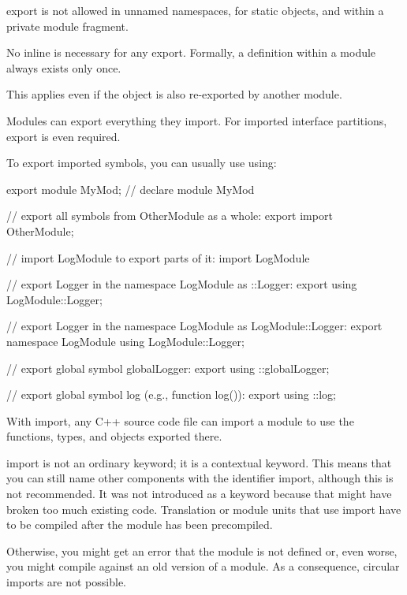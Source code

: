 export is not allowed in unnamed namespaces, for static objects, and within a private module fragment.

No inline is necessary for any export. Formally, a definition within a module always exists only once.

This applies even if the object is also re-exported by another module.


Modules can export everything they import. For imported interface partitions, export is even required.

To export imported symbols, you can usually use using:

\begin{cpp}
export module MyMod; // declare module MyMod

// export all symbols from OtherModule as a whole:
export import OtherModule;

// import LogModule to export parts of it:
import LogModule

// export Logger in the namespace LogModule as ::Logger:
export using LogModule::Logger;

// export Logger in the namespace LogModule as LogModule::Logger:
export namespace LogModule {
	using LogModule::Logger;
}

// export global symbol globalLogger:
export using ::globalLogger;

// export global symbol log (e.g., function log()):
export using ::log;
\end{cpp}



With import, any C++ source code file can import a module to use the functions, types, and objects exported there.

import is not an ordinary keyword; it is a contextual keyword. This means that you can still name other components with the identifier import, although this is not recommended. It was not introduced as a keyword because that might have broken too much existing code.
Translation or module units that use import have to be compiled after the module has been precompiled.

Otherwise, you might get an error that the module is not defined or, even worse, you might compile against an old version of a module. As a consequence, circular imports are not possible.



